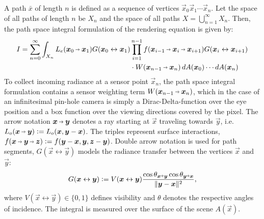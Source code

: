 A path $\bar{x}$ of length $n$ is defined as a sequence of vertices $\vec{x}_0 \vec{x}_1 \cdots \vec{x}_n$.
Let the space of all paths of length $n$ be $X_n$ and the space of all paths $X = \bigcup_{n=1}^{\infty} X_n$.
Then, the path space integral formulation of the rendering equation is given by:
\begin{equation}
\label{eq:path_space_integral}
\begin{aligned}
    I
    = \sum_{n=0}^{\infty} \int_{X_n} L_e(\pdir{0}{1}) \G{0}{1} &\prod_{i=1}^{n - 1} \f{i-1}{i}{i+1} \G{i}{i+1}\\
    &\cdot W(\pdir{n-1}{n}) \diff A(\vec{x}_0) \cdots \diff A(\vec{x}_n)
\end{aligned}
\end{equation}
To collect incoming radiance at a sensor point $\vec{x}_n$, the path space integral formulation contains a sensor weighting term $W(\pdir{n-1}{n})$, which in the case of an infinitesimal pin-hole camera is simply a Dirac-Delta-function over the eye position and a box function over the viewing directions covered by the pixel.
The arrow notation $\vec{x} \pto \vec{y}$ denotes a ray starting at $\vec{x}$ traveling towards $\vec{y}$, i.e. $L_o(\vec{x} \pto \vec{y}) \defeq L_o(\vec{x}, \vec{y} - \vec{x})$.
The triples represent surface interactions, $f(\vec{x} \pto \vec{y} \pto \vec{z}) \defeq f(\vec{y} - \vec{x}, \vec{y}, \vec{z} - \vec{y})$. 
Double arrow notation is used for path segments, $G(\vec{x} \leftrightarrow \vec{y})$ models the radiance transfer between the vertices $\vec{x}$ and $\vec{y}$:
\begin{equation}
\label{eq:transfer}
G(\vec{x} \leftrightarrow \vec{y}) \defeq V(\vec{x} \leftrightarrow \vec{y}) \frac{\cos \theta_{\vec{x} \veryshortarrow \vec{y}} \cos \theta_{\vec{y} \veryshortarrow \vec{x}}}{\|\vec{y} - \vec{x}\|^2},
\end{equation}
where $V(\vec{x} \leftrightarrow \vec{y}) \in \{0,1\}$ defines visibility and $\theta$ denotes the respective angles of incidence.
The integral is measured over the surface of the scene $A(\vec{x})$.

